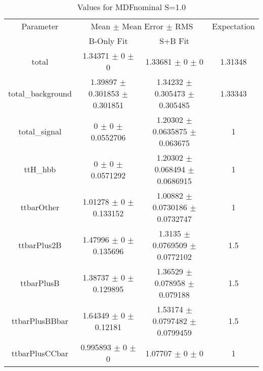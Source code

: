 \begin{table}
\centering
\caption{Values for MDFnominal S=1.0}
\begin{tabular}{cccc}
\toprule
Parameter & \multicolumn{2}{c}{Mean $\pm$ Mean Error $\pm$ RMS} & Expectation\\
 & B-Only Fit & S+B Fit & \\
\midrule
total & \num{1.34371} $\pm$ \num{0} $\pm$ \num{0} & \num{1.33681} $\pm$ \num{0} $\pm$ \num{0} & \num{1.31348}\\
total\_background & \num{1.39897} $\pm$ \num{0.301853} $\pm$ \num{0.301851} & \num{1.34232} $\pm$ \num{0.305473} $\pm$ \num{0.305485} & \num{1.33343}\\
total\_signal & \num{0} $\pm$ \num{0} $\pm$ \num{0.0552706} & \num{1.20302} $\pm$ \num{0.0635875} $\pm$ \num{0.063675} & \num{1}\\
ttH\_hbb & \num{0} $\pm$ \num{0} $\pm$ \num{0.0571292} & \num{1.20302} $\pm$ \num{0.068494} $\pm$ \num{0.0686915} & \num{1}\\
ttbarOther & \num{1.01278} $\pm$ \num{0} $\pm$ \num{0.133152} & \num{1.00882} $\pm$ \num{0.0730186} $\pm$ \num{0.0732747} & \num{1}\\
ttbarPlus2B & \num{1.47996} $\pm$ \num{0} $\pm$ \num{0.135696} & \num{1.3135} $\pm$ \num{0.0769509} $\pm$ \num{0.0772102} & \num{1.5}\\
ttbarPlusB & \num{1.38737} $\pm$ \num{0} $\pm$ \num{0.129895} & \num{1.36529} $\pm$ \num{0.078958} $\pm$ \num{0.079188} & \num{1.5}\\
ttbarPlusBBbar & \num{1.64349} $\pm$ \num{0} $\pm$ \num{0.12181} & \num{1.53174} $\pm$ \num{0.0797482} $\pm$ \num{0.0799459} & \num{1.5}\\
ttbarPlusCCbar & \num{0.995893} $\pm$ \num{0} $\pm$ \num{0} & \num{1.07707} $\pm$ \num{0} $\pm$ \num{0} & \num{1}\\
\bottomrule
\end{tabular}
\end{table}
